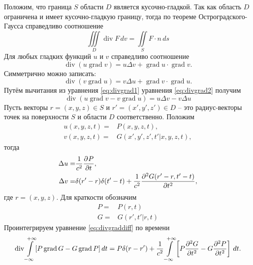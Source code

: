 \documentclass[a4paper, fontsize=14pt]{article}
\newcommand{\divop}{\operatorname{div}}
\newcommand{\gradop}{\operatorname{grad}}
\begin{document}
	 Положим, что граница $S$ области $D$ является кусочно-гладкой. Так как область $D$ ограничена и имеет кусочно-гладкую границу, тогда по
	теореме Остроградского-Гаусса справедливо соотношение
	\begin{equation}
		\iiint\limits_D \divop F \, dv = \iint\limits_S F \cdot n \, ds 
		\label{eq:vgauss}
	\end{equation}
	Для любых гладких функций $u$ и $v$ справедливо соотношение 
	\begin{equation}
		\divop (u \gradop v) = u\Delta v + \gradop u \cdot \gradop v.
		\label{eq:divgrad1}
	\end{equation}
	Симметрично можно записать:
	\begin{equation}
		\divop (v \gradop u) = v\Delta u + \gradop v \cdot \gradop u.
		\label{eq:divgrad2}
	\end{equation}
	Путём вычитания из уравнения \ref{eq:divgrad1} уравнения \ref{eq:divgrad2} получим 
	\begin{equation}
		\divop (u \gradop v - v \gradop u)  = u\Delta v - v \Delta u
		\label{eq:divgraddiff}
	\end{equation}
	Пусть векторы $r = (x,y,z) \in S$ и $r' = (x',y',z') \in D$ -- это радиус-векторы точек на поверхности $S$ и области $D$ соответственно.
	Положим 
	\begin{eqnarray}
		u(x,y,z,t) =& P(x,y,z,t),\label{eq:subsu}\\
		v(x,y,z,t) = &G(x',y',z',t'|x,y,z,t),\label{eq:subsv}
	\end{eqnarray}	
	тогда 
\begin{eqnarray}
	\Delta u =& \frac{1}{c^2} \diff[]{P}{t},\label{eq:subsdu}\\
	\Delta v = &\delta (r' - r) \delta(t' - t) + \frac{1}{c^2} \diff [2]{G(r' -r,t'-t)}{t},\label{eq:subsdv}
\end{eqnarray}
где $r=(x,y,z)$. Для краткости обозначим
	\begin{align*}
		P =& P(r,t) \\
		G =& G(r',t'|r,t)
	\end{align*}
	Проинтегрируем уравнение \ref{eq:divgraddiff} по времени
	\begin{equation}
		\divop \int\limits_{-\infty}^{+\infty} [P \gradop G - G \gradop P ]\, dt=  P\delta(r-r') +\frac{1}{c^2}\int\limits_{-\infty}^{+\infty}\left[P\diff[2]{G}{t} - G \diff[2]{P}{t}\right]\,dt.
		\label{eq:ugauss}
	\end{equation}
\end{document}

